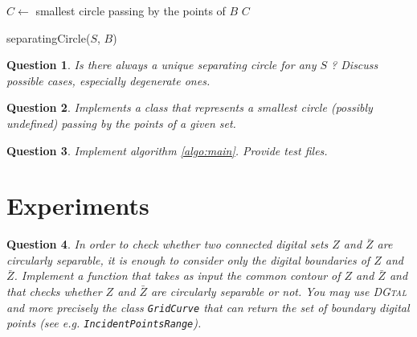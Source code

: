 \documentclass[a4paper, 11pt]{article}
\newtheorem{qu}{Question}
\begin{document}
\begin{algorithm}[Hhtbp]
   {
    $C \leftarrow $ smallest circle passing by the points of $B$ \;   
  } 
  \Return $C$ \; 
  \caption{separatingCircle($S$, $B$)}
  \label{algo:main}
\end{algorithm}



\begin{qu}
Is there always a unique separating circle for any $S$ ? Discuss possible cases, especially degenerate ones. 
\end{qu}


\begin{qu}
Implements a class that represents a smallest circle (possibly undefined) passing by the points of a given set.  
\end{qu}

\begin{qu}
Implement algorithm \ref{algo:main}. Provide test files. 
\end{qu}

\section{Experiments}

\begin{qu}
In order to check whether two connected digital sets $Z$ and $\bar{Z}$ are circularly separable, 
it is enough to consider only the digital boundaries of $Z$ and $\bar{Z}$. Implement a function
that takes as input the common contour of $Z$ and $\bar{Z}$ and that checks whether $Z$ and $\bar{Z}$
are circularly separable or not. You may use \textsc{DGtal} and more precisely the class {\tt GridCurve}
that can return the set of boundary digital points (see e.g. {\tt IncidentPointsRange}).    
\end{qu}
\end{document}
